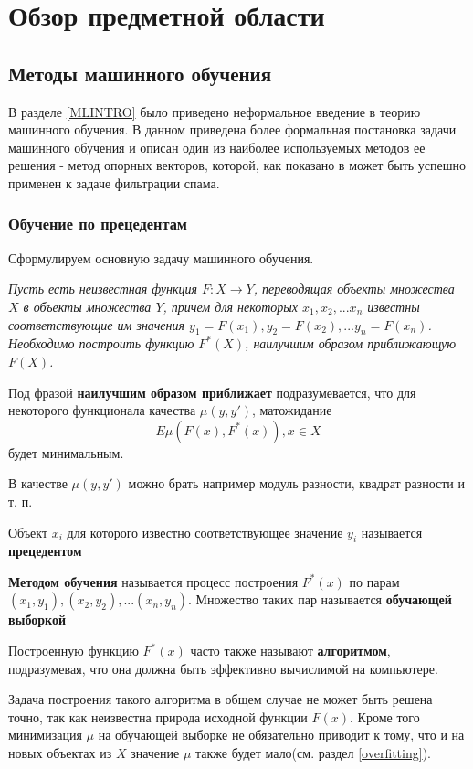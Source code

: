 \newpage
\section{Обзор предметной области}
\label{review}

\subsection{Методы машинного обучения} 
\label{ML}
В разделе \ref{MLINTRO} было приведено неформальное введение в теорию машинного обучения. В данном приведена более формальная постановка задачи машинного обучения и описан один из наиболее используемых методов ее решения - метод опорных векторов, которой, как показано в \cite{ROZ}  может быть успешно применен к задаче фильтрации спама. 
\subsubsection{Обучение по прецедентам}
Сформулируем основную задачу машинного обучения.

\textit{
Пусть есть неизвестная функция $F: X \rightarrow Y$, переводящая объекты
множества $X$ в объекты множества $Y$, причем для некоторых $x_1, x_2, ... x_n$ известны соответствующие им значения $y_1 = F(x_1), y_2 = F(x_2), ... y_n = F(x_n)$.
Необходимо построить функцию $F^*(X)$, наилучшим образом приближающую $F(X)$.
}

Под фразой \textbf{наилучшим образом приближает} подразумевается, что для некоторого функционала качества $\mu(y, y')$, матожидание
\begin{equation}
\label{matozh}
E\mu(F(x), F^*(x)), x \in X
\end{equation}
будет минимальным.

В качестве $\mu(y, y')$ можно брать например модуль разности, квадрат разности и т. п.

Объект $x_i$ для которого известно соответствующее значение $y_i$ называется \textbf{прецедентом}

\textbf{Методом обучения} называется процесс построения $F^*(x)$ по парам $(x_1, y_1), (x_2, y_2), ... (x_n, y_n)$. Множество таких пар называется \textbf{обучающей выборкой}

Построенную функцию $F^*(x)$ часто также называют \textbf{алгоритмом}, подразумевая,  что она должна быть эффективно вычислимой на компьютере.

Задача построения такого алгоритма в общем случае не может быть решена точно, так как неизвестна природа исходной функции $F(x)$. Кроме того минимизация $\mu$ на обучающей выборке не обязательно приводит к тому, что и на новых объектах из $X$ значение $\mu$ также будет мало(см. раздел \ref{overfitting}).


